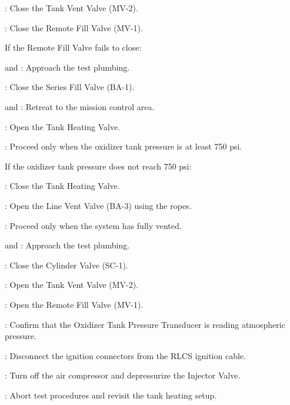 \begin{checklist}
    	\item \control{}: Close the Tank Vent Valve (MV-2).
    	\item \control{}: Close the Remote Fill Valve (MV-1). 
    	\begin{checklist}[label=$\bullet$]
    		\item If the Remote Fill Valve fails to close:
    		\begin{checklist}
    			\item \primary{} and \secondary{}: Approach the test plumbing. 
    			\item \primary{}: Close the Series Fill Valve (BA-1).
    			\item \primary{} and \secondary{}: Retreat to the mission control area. 
    		\end{checklist}
    	\end{checklist}
    	\item \control{}: Open the Tank Heating Valve. 
    	\item \daq{}: Proceed only when the oxidizer tank pressure is at least 750 psi. 
    	\begin{checklist}[label=$\bullet$]
    		\item If the oxidizer tank pressure does not reach 750 psi:
    		\begin{checklist}
    			\item \control{}: Close the Tank Heating Valve. 
    			\item \primary{}: Open the Line Vent Valve (BA-3) using the ropes.
    			\item \ops{}: Proceed only when the system has fully vented. 
    			\item \primary and \secondary{}: Approach the test plumbing. 
    			\item \primary{}: Close the Cylinder Valve (SC-1).
    			\item \control{}: Open the Tank Vent Valve (MV-2). 
    			\item \control{}: Open the Remote Fill Valve (MV-1). 
    			\item \daq{}: Confirm that the Oxidizer Tank Pressure Transducer is reading atmospheric pressure. 
    			\item \secondary{}: Disconnect the ignition connectors from the RLCS ignition cable. 
    			\item \primary{}: Turn off the air compressor and depressurize the Injector Valve. 
    			\item \ops{}: Abort test procedures and revisit the tank heating setup. 

\end{checklist}
\end{checklist}
\end{checklist}
